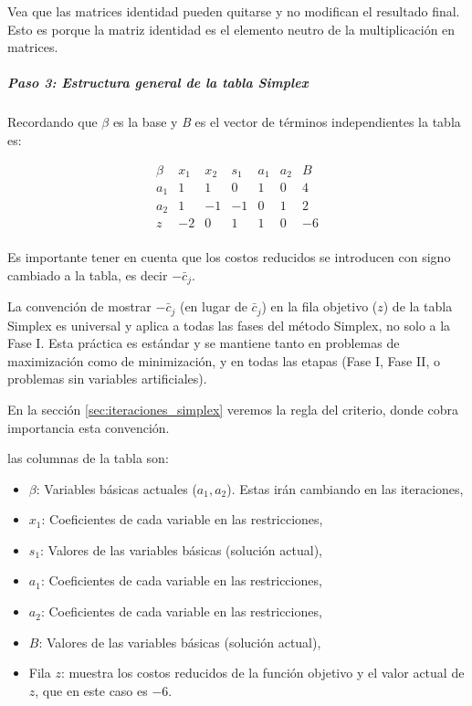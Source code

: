 \begin{tcolorbox}[myconclusion]
  Vea que las matrices identidad pueden quitarse y no modifican el resultado final. Esto es porque la matriz identidad es el elemento neutro de la multiplicación en matrices.
\end{tcolorbox}

\subparagraph{Paso 3: Estructura general de la tabla Simplex}

Recordando que \(\beta\) es la base y \textit{B} es el vector de términos independientes la tabla es:

\[
\begin{array}{c|ccccc|c}
\beta & x_1 & x_2 & s_1 & a_1 & a_2 & B \\
\hline
a_1 & 1 & 1 & 0 & 1 & 0 & 4 \\
a_2 & 1 & -1 & -1 & 0 & 1 & 2 \\
\hline
z & -2 & 0 & 1 & 1 & 0 & -6 \\
\end{array}
\]

\begin{tcolorbox}[danger_box, title=Prevención de Riesgos]
  Es importante tener en cuenta que los costos reducidos se introducen con signo cambiado a la tabla, es decir \(-\bar{c}_j\). 
  
  La convención de mostrar \(-\bar{c}_j\) (en lugar de \(\bar{c}_j\)) en la fila objetivo (\(z\)) de la tabla Simplex es universal y aplica a todas las fases del método Simplex, no solo a la Fase I. Esta práctica es estándar y se mantiene tanto en problemas de maximización como de minimización, y en todas las etapas (Fase I, Fase II, o problemas sin variables artificiales).

  En la sección \ref{sec:iteraciones_simplex} veremos la regla del criterio, donde cobra importancia esta convención.
\end{tcolorbox}

\noindent las columnas de la tabla son:
\begin{itemize}
  \item \(\beta\): Variables básicas actuales (\(a_1, a_2\)). Estas irán cambiando en las iteraciones,
  \item \(x_1\): Coeficientes de cada variable en las restricciones,
  \item \(s_1\): Valores de las variables básicas (solución actual),
  \item \(a_1\): Coeficientes de cada variable en las restricciones,
  \item \(a_2\): Coeficientes de cada variable en las restricciones,
  \item \(B\): Valores de las variables básicas (solución actual),
  \item Fila \(z\): muestra los costos reducidos de la función objetivo y el valor actual de \(z\), que en este caso es \(-6\).
\end{itemize}
